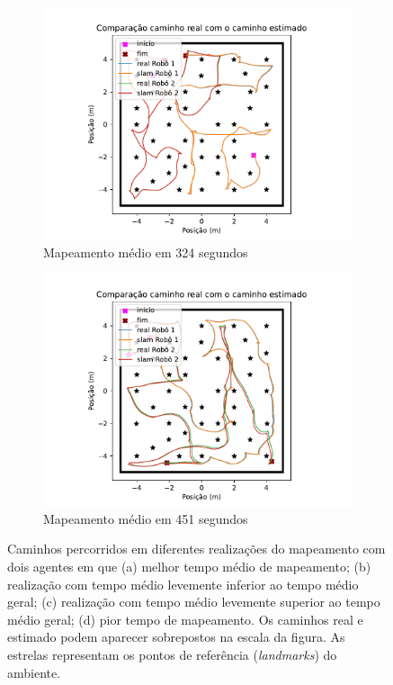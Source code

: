 \begin{figure}
\begin{subfigure}{0.49\textwidth}
    \includegraphics[width=\textwidth]{figs/two-agents/robots-path-medium-high.pdf} 
    \caption{Mapeamento médio em 324 segundos}
    \label{fig:two-agent-path-medium-high}
  \end{subfigure}
  \begin{subfigure}{0.49\textwidth}
    \includegraphics[width=\textwidth]{figs/two-agents/robots-path-worst.pdf} 
    \caption{Mapeamento médio em 451 segundos}
    \label{fig:two-agent-path-worst}
  \end{subfigure}
  \caption[Caminhos percorridos durante mapeamento com dois agentes]{Caminhos percorridos em diferentes realizações do mapeamento com dois agentes em que (a) melhor tempo médio de mapeamento; (b) realização com tempo médio levemente inferior ao tempo médio geral; (c) realização com tempo médio levemente 
  superior ao tempo médio geral; (d) pior tempo de mapeamento. Os caminhos 
  real e estimado podem aparecer sobrepostos na escala da figura. As estrelas representam os pontos de referência (\textit{landmarks}) do ambiente.}
  \label{fig:two-agent-path}
\end{figure}

